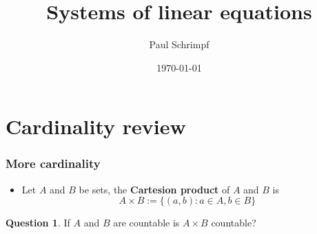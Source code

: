 \documentclass[compress]{beamer}
\title{Systems of linear equations}
\author{Paul Schrimpf}
\institute{UBC \\ Economics 526}
\date{\today}
\theoremstyle{definition}
\newtheorem{question}{Question}
\begin{document}
\frame{\titlepage}



\section*{Cardinality review}
\begin{frame}
  \frametitle{More cardinality}    
  \begin{itemize}
  \item Let $A$ and $B$ be sets, the \textbf{Cartesion product} of $A$
    and $B$ is
    \[ A \times B := \{(a, b) : a \in A, b \in B\} \]
  \end{itemize}
  
  \begin{question}
    If $A$ and $B$ are countable is $A \times B$ countable?
  \end{question}
\end{frame}
\end{document}

